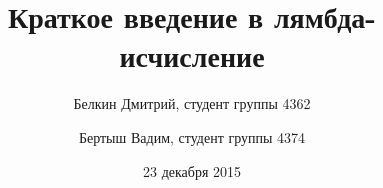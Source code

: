 \documentclass{article}
\begin{document}
\title{Краткое введение в лямбда-исчисление}
\author{Белкин Дмитрий, студент группы 4362
\and Бертыш Вадим, студент группы 4374}
\date{23 декабря 2015}
\maketitle
\newpage


\newpage

\newpage



\end{document}
